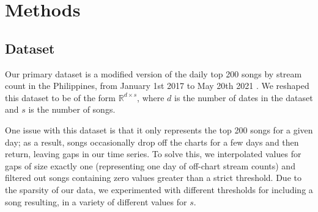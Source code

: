 \documentclass[11pt]{article}
\begin{document}
% 
% 
% 
% 
\section{Methods}

\subsection{Dataset}
Our primary dataset is a modified version of the daily top 200 songs by stream count in the Philippines, from January 1st 2017 to May 20th 2021 \cite{peralta_spotify_nodate}. We reshaped this dataset to be of the form $\mathbb{R}^{d \times s}$, where $d$ is the number of dates in the dataset and $s$ is the number of songs.

One issue with this dataset is that it only represents the top 200 songs for a given day; as a result, songs occasionally drop off the charts for a few days and then return, leaving gaps in our time series. To solve this, we interpolated values for gaps of size exactly one (representing one day of off-chart stream counts) and filtered out songs containing zero values greater than a strict threshold. Due to the sparsity of our data, we experimented with different thresholds for including a song resulting, in a variety of different values for $s$.
\end{document}
